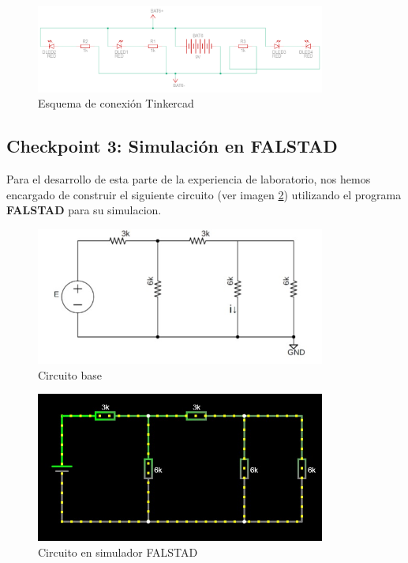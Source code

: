 \documentclass{article}
\begin{document}
\begin{figure}[H]
    \centering
    \includegraphics[width=0.85\textwidth]{./img/ckpt_2_3_2.png}
    \caption{Esquema de conexión Tinkercad}
    \label{fig:simulacion_esquema1}
\end{figure}

\subsection{Checkpoint 3: Simulación en FALSTAD}
Para el desarrollo de esta parte de la experiencia de laboratorio, nos hemos encargado de construir el siguiente circuito (ver imagen \ref{fig:circutio_base_chkp3}) utilizando el programa \textbf{FALSTAD} para su simulacion.

\begin{figure}[H]
    \centering
    \includegraphics[width=0.85\textwidth]{./img/Circuito-3.jpeg}
    \caption{Circuito base}
    \label{fig:circutio_base_chkp3}
\end{figure}

\begin{figure}[H]
    \centering
    \includegraphics[width=0.85\textwidth]{./img/Falstad.jpeg}
    \caption{Circuito en simulador FALSTAD}
    \label{fig:circuito_falstad}
\end{figure}
\end{document}
